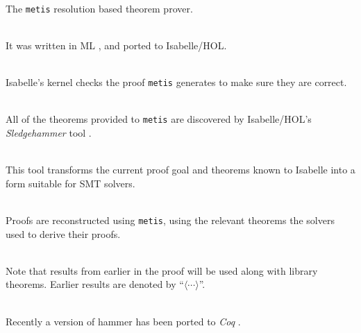 \documentclass{beamer}
\begin{document}
\begin{frame}{\insertsubsectionhead\
    \textemdash\ \insertsubsubsectionhead}
  \framebreak

  The \texttt{metis} resolution based theorem prover.\\~\

  It was written in ML \cite{hurdFirstorderProofTactics2003}, and
  ported to Isabelle/HOL.\\~\

  Isabelle's kernel checks the proof \texttt{metis} generates to make
  sure they are correct.\\~\

  \framebreak

  All of the theorems provided to \texttt{metis} are discovered by
  Isabelle/HOL's \emph{Sledgehammer} tool
  \cite{mengAutomationInteractiveProof2006,
    paulsonSourceLevelProofReconstruction2007}.\\~\

  This tool transforms the current proof goal and theorems known to
  Isabelle into a form suitable for SMT solvers. \\~\

  Proofs are reconstructed using \texttt{metis}, using the relevant
  theorems the solvers used to derive their proofs.\\~\

  Note that results from earlier in the proof will be used along with
  library theorems.  Earlier results are denoted by
  ``$\langle \cdots \rangle$''.\\~\

  Recently a version of hammer has been ported to \emph{Coq}
  \cite{czajkaHammerCoqAutomation2018}.

  \framebreak


\end{frame}
\end{document}
